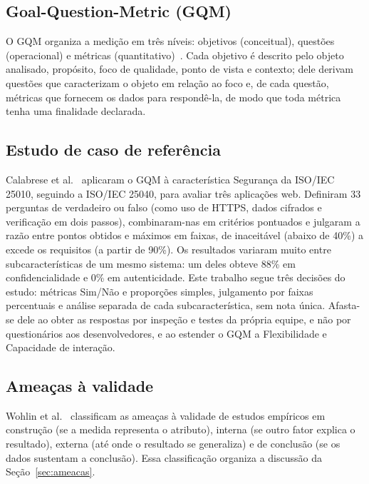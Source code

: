 \documentclass[conference]{IEEEtran}
\begin{document}
\subsection{Goal-Question-Metric (GQM)}
O GQM organiza a medição em três níveis: objetivos (conceitual), questões
(operacional) e métricas (quantitativo)~\cite{basili94}. Cada objetivo é
descrito pelo objeto analisado, propósito, foco de qualidade, ponto de vista
e contexto; dele derivam questões que caracterizam o objeto em relação ao
foco e, de cada questão, métricas que fornecem os dados para respondê-la, de
modo que toda métrica tenha uma finalidade declarada.

\subsection{Estudo de caso de referência}
Calabrese et al.~\cite{calabrese17} aplicaram o GQM à característica
Segurança da ISO/IEC 25010, seguindo a ISO/IEC 25040, para avaliar três
aplicações web. Definiram 33 perguntas de verdadeiro ou falso (como uso de
HTTPS, dados cifrados e verificação em dois passos), combinaram-nas em
critérios pontuados e julgaram a razão entre pontos obtidos e máximos em
faixas, de inaceitável (abaixo de 40\%) a excede os requisitos (a partir de
90\%). Os resultados variaram muito entre subcaracterísticas de um mesmo
sistema: um deles obteve 88\% em confidencialidade e 0\% em autenticidade.
Este trabalho segue três decisões do estudo: métricas Sim/Não e proporções
simples, julgamento por faixas percentuais e análise separada de cada
subcaracterística, sem nota única. Afasta-se dele ao obter as respostas por
inspeção e testes da própria equipe, e não por questionários aos
desenvolvedores, e ao estender o GQM a Flexibilidade e Capacidade de
interação.

\subsection{Ameaças à validade}
Wohlin et al.~\cite{wohlin12} classificam as ameaças à validade de estudos
empíricos em construção (se a medida representa o atributo), interna (se
outro fator explica o resultado), externa (até onde o resultado se
generaliza) e de conclusão (se os dados sustentam a conclusão). Essa
classificação organiza a discussão da Seção~\ref{sec:ameacas}.

\end{document}
